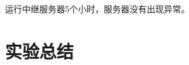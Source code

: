 \documentclass[lang=cn,11pt,a4paper,cite=authornum]{paper}
\begin{document}
运行中继服务器5个小时，服务器没有出现异常。

\section{实验总结}

\end{document}
